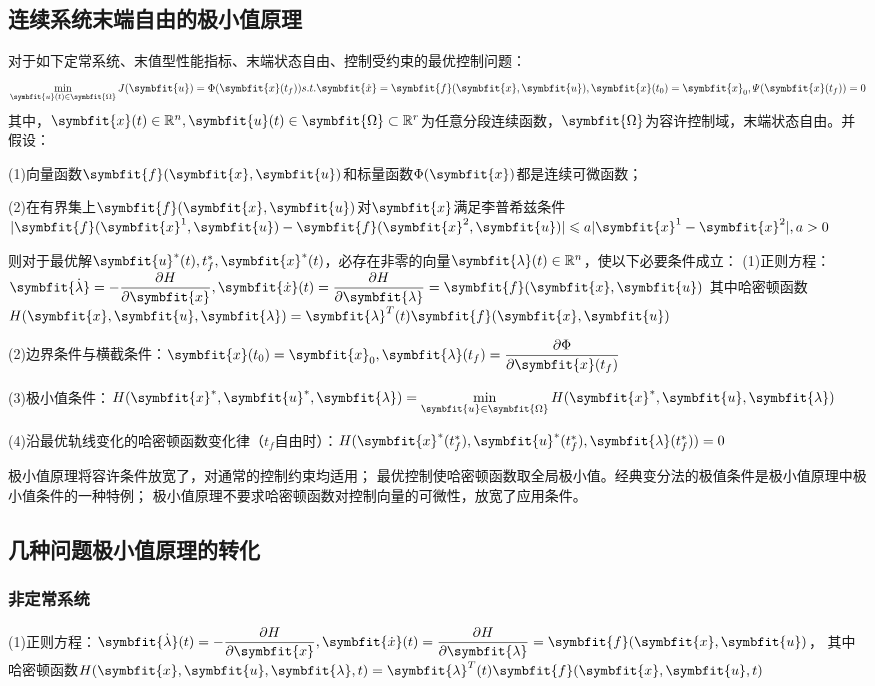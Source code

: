 \documentclass[11pt,a4paper]{ctexart}
\newcommand{\bm}{\symbfit}
\begin{document}
    \subsection{连续系统末端自由的极小值原理}
        对于如下定常系统、末值型性能指标、末端状态自由、控制受约束的最优控制问题：
        \[
        \min\limits_{\bm{u}(t)\in\bm{\Omega}}J(\bm{u})=\Phi(\bm{x}(t_f))
        s.t.\bm{\dot x}=\bm{f}(\bm{x},\bm{u}),\bm{x}(t_0)=\bm{x}_0,\varPsi(\bm{x}(t_f))=0
        \]
        其中，$\bm{x}(t)\in\mathbb{R}^n,\bm{u}(t)\in\bm{\Omega}\subset\mathbb{R}^r$为任意分段连续函数，$\bm{\Omega}$为容许控制域，末端状态自由。并假设：

        (1)向量函数$\bm{f}(\bm{x},\bm{u})$和标量函数$\Phi(\bm{x})$都是连续可微函数；
        
        (2)在有界集上$\bm{f}(\bm{x},\bm{u})$对$\bm{x}$满足李普希兹条件$|\bm{f}(\bm{x}^1,\bm{u})-\bm{f}(\bm{x}^2,\bm{u})|\leqslant a|\bm{x}^1-\bm{x}^2|,a>0$
        
        则对于最优解$\bm{u}^*(t),t_f^*,\bm{x}^*(t)$，必存在非零的向量$\bm{\lambda}(t)\in\mathbb{R}^n$，使以下必要条件成立：
        (1)正则方程：$\bm{\dot\lambda}=-\dfrac{\partial H}{\partial\bm{x}},\bm{\dot x}(t)=\dfrac{\partial H}{\partial\bm{\lambda}}=\bm{f}(\bm{x},\bm{u})$
        其中哈密顿函数$H(\bm{x},\bm{u},\bm{\lambda})=\bm{\lambda}^T(t)\bm{f}(\bm{x},\bm{u})$
        
        (2)边界条件与横截条件：$\bm{x}(t_0)=\bm{x}_0,\bm{\lambda}(t_f)=\dfrac{\partial\Phi}{\partial\bm{x}(t_f)}$
        
        (3)极小值条件：$H(\bm{x}^*,\bm{u}^*,\bm{\lambda})=\min\limits_{\bm{u}\in\bm{\Omega}}H(\bm{x}^*,\bm{u},\bm{\lambda})$
        
        (4)沿最优轨线变化的哈密顿函数变化律（$t_f$自由时）：$H(\bm{x}^*(t_f^*),\bm{u}^*(t_f^*),\bm{\lambda}(t_f^*))=0$
        
        极小值原理将容许条件放宽了，对通常的控制约束均适用；
        最优控制使哈密顿函数取全局极小值。经典变分法的极值条件是极小值原理中极小值条件的一种特例；
        极小值原理不要求哈密顿函数对控制向量的可微性，放宽了应用条件。
    \subsection{几种问题极小值原理的转化}
        \subsubsection{非定常系统}
            (1)正则方程：$\bm{\dot\lambda}(t)=-\dfrac{\partial H}{\partial\bm{x}},\bm{\dot x}(t)=\dfrac{\partial H}{\partial\bm{\lambda}}=\bm{f}(\bm{x},\bm{u})$，
            其中哈密顿函数$H(\bm{x},\bm{u},\bm{\lambda},t)=\bm{\lambda}^T(t)\bm{f}(\bm{x},\bm{u},t)$
\end{document}
